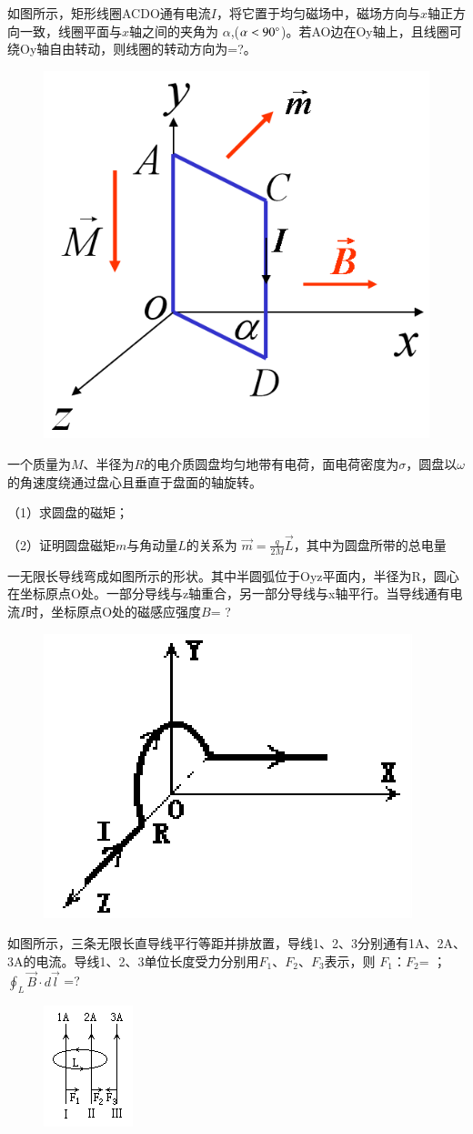 \documentclass[lang=cn,10pt]{elegantbook}
\begin{document}
	\begin{exercise}
		如图所示，矩形线圈ACDO通有电流$I$，将它置于均匀磁场中，磁场方向与$x$轴正方向一致，线圈平面与$x$轴之间的夹角为 $\alpha$,($\alpha<90\degree$)。若AO边在Oy轴上，且线圈可绕Oy轴自由转动，则线圈的转动方向为=?。
		
\begin{figure}[H]
	\centering
	\includegraphics[width=0.18\linewidth]{image/图片15}
	\caption{}
	\label{fig:15}
\end{figure}
		
	\end{exercise}
	\begin{exercise}
		一个质量为$M$、半径为$R$的电介质圆盘均匀地带有电荷，面电荷密度为$\sigma$，圆盘以$\omega$的角速度绕通过盘心且垂直于盘面的轴旋转。
		
		（1）求圆盘的磁矩；
		
		（2）证明圆盘磁矩$m$与角动量$L$的关系为  $\overrightarrow{m}=\frac{q}{2M}\overrightarrow{L}$，其中为圆盘所带的总电量
	\end{exercise}
	\begin{exercise}
		一无限长导线弯成如图所示的形状。其中半圆弧位于Oyz平面内，半径为R，圆心在坐标原点O处。一部分导线与z轴重合，另一部分导线与x轴平行。当导线通有电流$I$时，坐标原点O处的磁感应强度$B $= ?
		
		
\begin{figure}[H]
	\centering
	\includegraphics[width=0.18\linewidth]{image/图片16}
	\caption{}
	\label{fig:16}
\end{figure}
	\end{exercise}
	\begin{exercise}
		如图所示，三条无限长直导线平行等距并排放置，导线1、2、3分别通有1A、2A、3A的电流。导线1、2、3单位长度受力分别用$F_{1}$、$F_{2}$、$F_{3}$表示，则          $F_{1}$：$F_{2}$=             ；                $\oint_L{\overrightarrow{B}\cdot d\overrightarrow{l}}$ =? 	          
\begin{figure}[H]
	\centering
	\includegraphics[width=0.18\linewidth]{image/图片17}
	\caption{}
	\label{fig:17}
\end{figure}
	\end{exercise}
\end{document}
